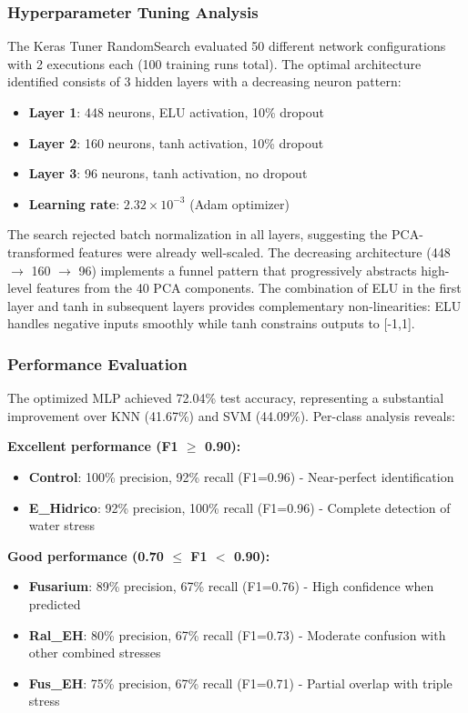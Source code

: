\documentclass[12pt,a4paper]{article}
\begin{document}
\subsubsection{Hyperparameter Tuning Analysis}

The Keras Tuner RandomSearch evaluated 50 different network configurations with 2 executions each (100 training runs total). The optimal architecture identified consists of 3 hidden layers with a decreasing neuron pattern:

\begin{itemize}
    \item \textbf{Layer 1}: 448 neurons, ELU activation, 10\% dropout
    \item \textbf{Layer 2}: 160 neurons, tanh activation, 10\% dropout  
    \item \textbf{Layer 3}: 96 neurons, tanh activation, no dropout
    \item \textbf{Learning rate}: $2.32 \times 10^{-3}$ (Adam optimizer)
\end{itemize}

The search rejected batch normalization in all layers, suggesting the PCA-transformed features were already well-scaled. The decreasing architecture (448 $\rightarrow$ 160 $\rightarrow$ 96) implements a funnel pattern that progressively abstracts high-level features from the 40 PCA components. The combination of ELU in the first layer and tanh in subsequent layers provides complementary non-linearities: ELU handles negative inputs smoothly while tanh constrains outputs to [-1,1].

\subsubsection{Performance Evaluation}

The optimized MLP achieved 72.04\% test accuracy, representing a substantial improvement over KNN (41.67\%) and SVM (44.09\%). Per-class analysis reveals:

\textbf{Excellent performance (F1 $\geq$ 0.90):}
\begin{itemize}
    \item \textbf{Control}: 100\% precision, 92\% recall (F1=0.96) - Near-perfect identification
    \item \textbf{E\_Hidrico}: 92\% precision, 100\% recall (F1=0.96) - Complete detection of water stress
\end{itemize}

\textbf{Good performance (0.70 $\leq$ F1 $<$ 0.90):}
\begin{itemize}
    \item \textbf{Fusarium}: 89\% precision, 67\% recall (F1=0.76) - High confidence when predicted
    \item \textbf{Ral\_EH}: 80\% precision, 67\% recall (F1=0.73) - Moderate confusion with other combined stresses
    \item \textbf{Fus\_EH}: 75\% precision, 67\% recall (F1=0.71) - Partial overlap with triple stress
\end{itemize}
\end{document}
